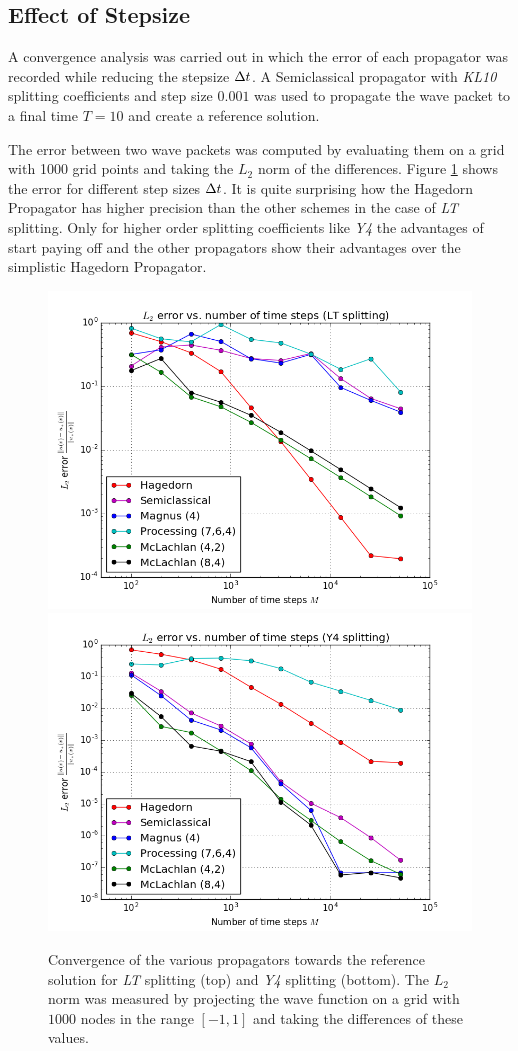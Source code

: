 \subsection{Effect of Stepsize}
\label{subsec:convergence}
%
A convergence analysis was carried out in which the error of each propagator was recorded while reducing the stepsize $\Delta t$.
A Semiclassical propagator with \emph{KL10} splitting coefficients and step size $0.001$ was used to propagate the wave packet to a final time $T = 10$ and create a reference solution.
\par\medskip
%
The error between two wave packets was computed by evaluating them on a grid with 1000 grid points and taking the $L_2$ norm of the differences.
Figure \ref{fig:error_analysis} shows the error for different step sizes $\Delta t$.
It is quite surprising how the Hagedorn Propagator has higher precision than the other schemes in the case of \emph{LT} splitting.
Only for higher order splitting coefficients like \emph{Y4} the advantages of  start paying off and the other propagators show their advantages over the simplistic Hagedorn Propagator.
%
\begin{figure}[ht]
	\centering
	\includegraphics[width=.8\textwidth]{figures/error_analysis_lt.png} \\
	\includegraphics[width=.8\textwidth]{figures/error_analysis_y4.png}
	\caption{Convergence of the various propagators towards the reference solution for \emph{LT} splitting (top) and \emph{Y4} splitting (bottom). The $L_2$ norm was measured by projecting the wave function on a grid with $1000$ nodes in the range $[-1,1]$ and taking the differences of these values.}
	\label{fig:error_analysis}
\end{figure}

